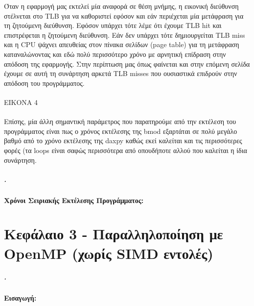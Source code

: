 \documentclass[greek,booktabs,8pt,flagBlueCMYK]{report}
\begin{document}
Όταν η εφαρμογή μας εκτελεί μία αναφορά σε θέση μνήμης, η εικονική διεύθυνση στέλνεται στο TLB για να καθοριστεί εφόσον και εάν περιέχεται μία μετάφραση για τη ζητούμενη διεύθυνση. Εφόσον υπάρχει τότε λέμε ότι έχουμε TLB hit και επιστρέφεται η ζητούμενη διεύθυνση. Εάν δεν υπάρχει τότε δημιουργείται TLB miss και η CPU ψάχνει απευθείας στον πίνακα σελίδων (page table) για τη μετάφραση καταναλώνοντας και εδώ πολύ περισσότερο χρόνο με αρνητική επίδραση στην απόδοση της εφαρμογής.  
\FloatBarrier 
Στην περίπτωση μας όπως φαίνεται και στην επόμενη σελίδα έχουμε σε αυτή τη συνάρτηση αρκετά TLB misses που ουσιαστικά επιδρούν στην απόδοση του προγράμματος. 
\\ \\
EIKONA 4
\\ \\
Επίσης, μία άλλη σημαντική παράμετρος που παρατηρούμε από την εκτέλεση του προγράμματος είναι πως ο χρόνος εκτέλεσης της bmod εξαρτάται σε πολύ μεγάλο βαθμό από το χρόνο εκτέλεσης της daxpy καθώς εκεί καλείται και τις περισσότερες φορές (τα loops είναι σαφώς περισσότερα από οπουδήποτε αλλού που καλείται η ίδια συνάρτηση.  

\paragraph{.} \textbf{Χρόνοι Σειριακής Εκτέλεσης Προγράμματος:}\newline

%


%

%

\clearpage
\chapter{Κεφάλαιο 3 - Παραλληλοποίηση με OpenMP (χωρίς SIMD εντολές)}
\paragraph{.} \textbf{Εισαγωγή:}\newline
\end{document}
